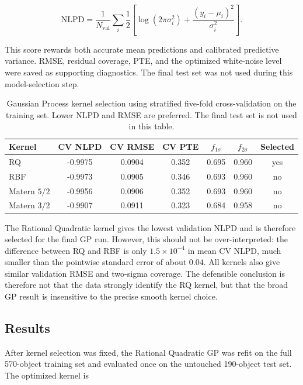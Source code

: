 \documentclass{article}
\numberwithin{equation}{section}
\begin{document}
\begin{equation}
\mathrm{NLPD}
=
\frac{1}{N_{\mathrm{val}}}
\sum_i
\frac{1}{2}
\left[
\log(2\pi\sigma_i^2)
+
\frac{(y_i-\mu_i)^2}{\sigma_i^2}
\right].
\end{equation}

This score rewards both accurate mean predictions and calibrated predictive variance. RMSE, residual coverage, PTE, and the optimized white-noise level were saved as supporting diagnostics. The final test set was not used during this model-selection step.

\begin{table}[H]
\centering
\caption{Gaussian Process kernel selection using stratified five-fold cross-validation on the training set. Lower NLPD and RMSE are preferred. The final test set is not used in this table.}
\label{tab:gp-model-comparison}
\begin{tabular}{lcccccc}
\toprule
Kernel & CV NLPD & CV RMSE & CV PTE & $f_{1\sigma}$ & $f_{2\sigma}$ & Selected \\
\midrule
RQ & -0.9975 & 0.0904 & 0.352 & 0.695 & 0.960 & yes \\
RBF & -0.9973 & 0.0905 & 0.346 & 0.693 & 0.960 & no \\
Matern $5/2$ & -0.9956 & 0.0906 & 0.352 & 0.693 & 0.960 & no \\
Matern $3/2$ & -0.9907 & 0.0911 & 0.323 & 0.684 & 0.958 & no \\
\bottomrule
\end{tabular}
\end{table}

The Rational Quadratic kernel gives the lowest validation NLPD and is therefore selected for the final GP run. However, this should not be over-interpreted: the difference between RQ and RBF is only $1.5\times10^{-4}$ in mean CV NLPD, much smaller than the pointwise standard error of about $0.04$. All kernels also give similar validation RMSE and two-sigma coverage. The defensible conclusion is therefore not that the data strongly identify the RQ kernel, but that the broad GP result is insensitive to the precise smooth kernel choice.

\subsection{Results}

After kernel selection was fixed, the Rational Quadratic GP was refit on the full 570-object training set and evaluated once on the untouched 190-object test set. The optimized kernel is
\end{document}
